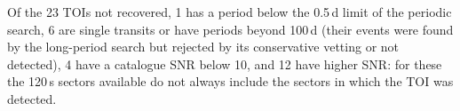 Of the 23 TOIs not recovered, 1 has a period below the 0.5\,d limit of
the periodic search, 6 are single transits or have periods beyond 100\,d (their
events were found by the long-period search but rejected by its conservative vetting or not
detected), 4 have a catalogue SNR below 10, and 12 have higher SNR:
for these the 120\,s sectors available do not always include the sectors in which the TOI was
detected.
